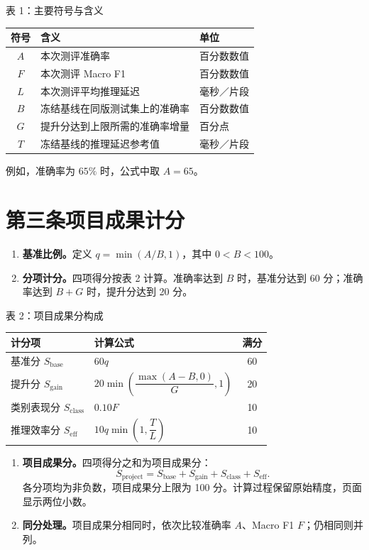 \documentclass[UTF8,a4paper,12pt,fontset=windows]{ctexart}
\newcommand{\article}[2]{\section*{\centering 第#1条\quad #2}\markboth{第#1条\quad #2}{}}
\begin{document}
\begin{center}
\small 表 1：主要符号与含义\\[5pt]
\begin{tabularx}{\textwidth}{@{}cXl@{}}
\toprule
符号 & 含义 & 单位\\
\midrule
$A$ & 本次测评准确率 & 百分数数值\\
$F$ & 本次测评 Macro F1 & 百分数数值\\
$L$ & 本次测评平均推理延迟 & 毫秒／片段\\
$B$ & 冻结基线在同版测试集上的准确率 & 百分数数值\\
$G$ & 提升分达到上限所需的准确率增量 & 百分点\\
$T$ & 冻结基线的推理延迟参考值 & 毫秒／片段\\
\bottomrule
\end{tabularx}
\end{center}
例如，准确率为 $65\%$ 时，公式中取 $A=65$。

\article{三}{项目成果计分}
\begin{enumerate}
\item \textbf{基准比例。}定义 $q=\min(A/B,1)$，其中 $0<B<100$。
\item \textbf{分项计分。}四项得分按表 2 计算。准确率达到 $B$ 时，基准分达到 60 分；准确率达到 $B+G$ 时，提升分达到 20 分。
\end{enumerate}


\begin{center}
\small 表 2：项目成果分构成\\[6pt]
\begin{tabularx}{\textwidth}{@{}lXc@{}}
\toprule
计分项 & 计算公式 & 满分\\
\midrule
基准分 $S_{\mathrm{base}}$ & $60q$ & 60\\[5pt]
提升分 $S_{\mathrm{gain}}$ & $20\min\!\left(\dfrac{\max(A-B,0)}{G},1\right)$ & 20\\[9pt]
类别表现分 $S_{\mathrm{class}}$ & $0.10F$ & 10\\[5pt]
推理效率分 $S_{\mathrm{eff}}$ & $10q\min\!\left(1,\dfrac{T}{L}\right)$ & 10\\[6pt]
\bottomrule
\end{tabularx}
\end{center}
\begin{enumerate}[start=3]
\item \textbf{项目成果分。}四项得分之和为项目成果分：
\[
 S_{\mathrm{project}}=
 S_{\mathrm{base}}+S_{\mathrm{gain}}+S_{\mathrm{class}}+S_{\mathrm{eff}}.
\]
各分项均为非负数，项目成果分上限为 100 分。计算过程保留原始精度，页面显示两位小数。
\item \textbf{同分处理。}项目成果分相同时，依次比较准确率 $A$、Macro F1 $F$；仍相同则并列。
\end{enumerate}
\end{document}
